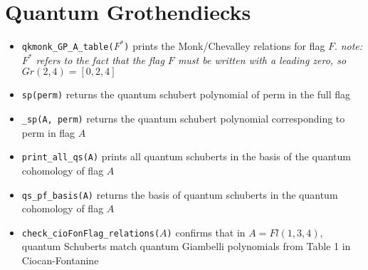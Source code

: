 \documentclass[11pt]{article}
\begin{document}
\section{Quantum Grothendiecks}
\begin{itemize}
    \item \texttt{qkmonk\_GP\_A\_table($F^*$)} prints the Monk/Chevalley relations for flag $F$. \textit{note: $F^*$ refers to the fact that the flag $F$ must be written with a leading zero, so $Gr(2, 4) = [0, 2, 4]$}
    \item \texttt{sp(perm)} returns the quantum schubert polynomial of perm in the full flag
    \item \texttt{\_sp(A, perm)} returns the quantum schubert polynomial corresponding to perm in flag $A$
    \item \texttt{print\_all\_qs(A)} prints all quantum schuberts in the basis of the quantum cohomology of flag $A$
    \item \texttt{qs\_pf\_basis(A)} returns the basis of quantum schuberts in the quantum cohomology of flag $A$
    \item \texttt{check\_cioFonFlag\_relations($A$)} confirms that in $A = Fl(1, 3, 4)$, quantum Schuberts match quantum Giambelli polynomials from Table 1 in Ciocan-Fontanine
\end{itemize}
\end{document}
